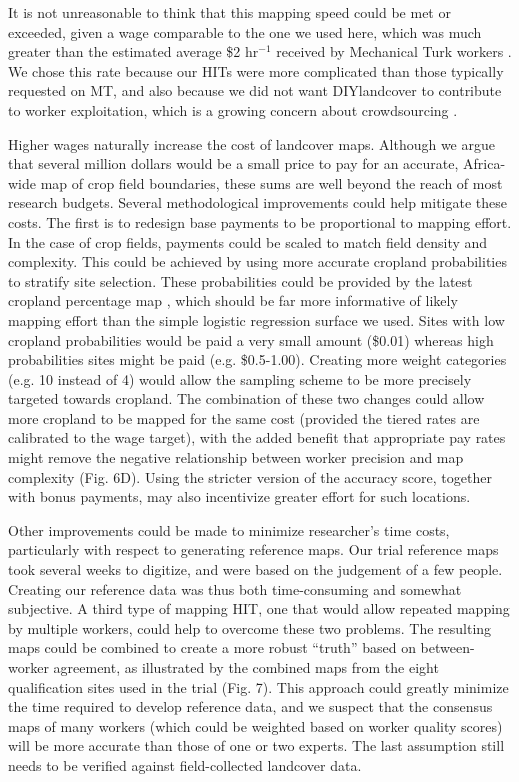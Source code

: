 \documentclass[preprint,12pt,authoryear]{elsarticle}
\begin{document}
It is not unreasonable to think that this mapping speed could be met or exceeded, given a wage comparable to the one we used here, which was much greater than the estimated average \$2 hr$^{-1}$ received by Mechanical Turk workers \citep{marvit_how_2014}. We chose this rate because our HITs were more complicated than those typically requested on MT, and also because we did not want DIYlandcover to contribute to worker exploitation, which is a growing concern about crowdsourcing \citep{marvit_how_2014}. 

Higher wages naturally increase the cost of landcover maps. Although we argue that several million dollars would be a small price to pay for an accurate, Africa-wide map of crop field boundaries, these sums are well beyond the reach of most research budgets. Several methodological improvements could help mitigate these costs. The first is to redesign base payments to be proportional to mapping effort. In the case of crop fields, payments could be scaled to match field density and complexity. This could be achieved by using more accurate cropland probabilities to stratify site selection. These probabilities could be provided by the latest cropland percentage map \citep{fritz_mapping_2015}, which should be far more informative of likely mapping effort than the simple logistic regression surface we used. Sites with low cropland probabilities would be paid a very small amount (\$0.01) whereas high probabilities sites might be paid  (e.g. \$0.5-1.00). Creating more weight categories (e.g. 10 instead of 4) would allow the sampling scheme to be more precisely targeted towards cropland. The combination of these two changes could allow more cropland to be mapped for the same cost (provided the tiered rates are calibrated to the wage target), with the added benefit that appropriate pay rates might remove the negative relationship between worker precision and map complexity (Fig. 6D). Using the stricter version of the accuracy score, together with bonus payments, may also incentivize greater effort for such locations.   

Other improvements could be made to minimize researcher's time costs, particularly with respect to generating reference maps. Our trial reference maps took several weeks to digitize, and were based on the judgement of a few people. Creating our reference data was thus both time-consuming and somewhat subjective. A third type of mapping HIT, one that would allow repeated mapping by multiple workers, could help to overcome these two problems. The resulting maps could be combined to create a more robust ``truth'' based on between-worker agreement, as illustrated by the combined maps from the eight qualification sites used in the trial (Fig. 7). This approach could greatly minimize the time required to develop reference data, and we suspect that the consensus maps of many workers (which could be weighted based on worker quality scores) will be more accurate than those of one or two experts. The last assumption still needs to be verified against field-collected landcover data.   
\end{document}
